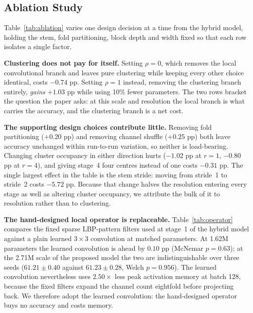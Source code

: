\subsection{Ablation Study}
\label{sec:ablation}

Table~\ref{tab:ablation} varies one design decision at a time from the hybrid
model, holding the stem, fold partitioning, block depth and width fixed so
that each row isolates a single factor.

\textbf{Clustering does not pay for itself.} Setting $\rho = 0$, which removes
the local convolutional branch and leaves pure clustering while keeping every
other choice identical, costs $-0.74$ pp. Setting $\rho = 1$ instead, removing
the clustering branch entirely, \emph{gains} $+1.03$ pp while using 10\% fewer
parameters. The two rows bracket the question the paper asks: at this scale and
resolution the local branch is what carries the accuracy, and the clustering
branch is a net cost.

\textbf{The supporting design choices contribute little.} Removing fold
partitioning ($+0.20$ pp) and removing channel shuffle ($+0.25$ pp) both leave
accuracy unchanged within run-to-run variation, so neither is load-bearing.
Changing cluster occupancy in either direction hurts ($-1.02$ pp at $r = 1$,
$-0.80$ pp at $r = 4$), and giving stage~4 four centres instead of one costs
$-0.31$ pp. The single largest effect in the table is the stem stride: moving
from stride~1 to stride~2 costs $-5.72$ pp. Because that change halves the
resolution entering every stage as well as altering cluster occupancy, we
attribute the bulk of it to resolution rather than to clustering.

\textbf{The hand-designed local operator is replaceable.}
Table~\ref{tab:operator} compares the fixed sparse LBP-pattern filters used at
stage~1 of the hybrid model against a plain learned $3\times3$ convolution at
matched parameters. At 1.62M parameters the learned convolution is ahead by
$0.10$ pp (McNemar $p = 0.63$); at the 2.71M scale of the proposed model the
two are indistinguishable over three seeds ($61.21 \pm 0.40$ against
$61.23 \pm 0.28$, Welch $p = 0.956$). The learned convolution nevertheless
uses $2.50\times$ less peak activation memory at batch 128, because the fixed
filters expand the channel count eightfold before projecting back. We
therefore adopt the learned convolution: the hand-designed operator buys no
accuracy and costs memory.

